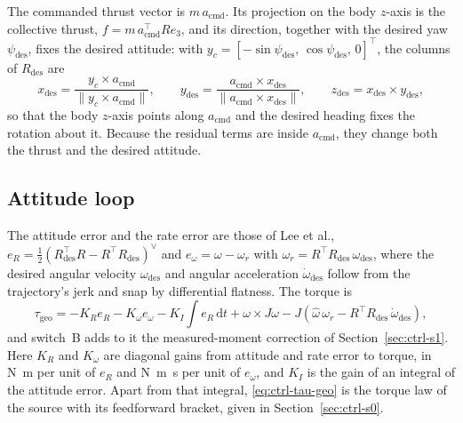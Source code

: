 The commanded thrust vector is $m\,a_{\mathrm{cmd}}$. Its projection on the body $z$-axis is the
collective thrust, $f = m\,a_{\mathrm{cmd}}^\top R e_3$, and its direction, together with the desired
yaw $\psi_{\mathrm{des}}$, fixes the desired attitude: with
$y_c = [-\sin\psi_{\mathrm{des}},\, \cos\psi_{\mathrm{des}},\, 0]^\top$, the columns of
$R_{\mathrm{des}}$ are
\begin{equation*}
  x_{\mathrm{des}} = \frac{y_c \times a_{\mathrm{cmd}}}{\lVert y_c \times a_{\mathrm{cmd}} \rVert}, \qquad
  y_{\mathrm{des}} = \frac{a_{\mathrm{cmd}} \times x_{\mathrm{des}}}{\lVert a_{\mathrm{cmd}} \times x_{\mathrm{des}} \rVert}, \qquad
  z_{\mathrm{des}} = x_{\mathrm{des}} \times y_{\mathrm{des}},
\end{equation*}
so that the body $z$-axis points along $a_{\mathrm{cmd}}$ and the desired heading fixes the rotation
about it. Because the residual terms are inside $a_{\mathrm{cmd}}$, they change both the thrust and
the desired attitude.

\subsection{Attitude loop}

The attitude error and the rate error are those of Lee et al.,
$e_R = \tfrac{1}{2}\left(R_{\mathrm{des}}^\top R - R^\top R_{\mathrm{des}}\right)^\vee$ and
$e_\omega = \omega - \omega_r$ with $\omega_r = R^\top R_{\mathrm{des}}\,\omega_{\mathrm{des}}$, where
the desired angular velocity $\omega_{\mathrm{des}}$ and angular acceleration
$\dot\omega_{\mathrm{des}}$ follow from the trajectory's jerk and snap by differential flatness. The
torque is
%
\begin{equation}
  \tau_{\mathrm{geo}} = -K_R e_R - K_\omega e_\omega - K_I \!\int\! e_R \,\mathrm{d}t + \omega \times J\omega
         - J\!\left( \hat{\omega}\, \omega_r - R^\top R_{\mathrm{des}}\, \dot\omega_{\mathrm{des}} \right),
  \label{eq:ctrl-tau-geo}
\end{equation}
%
and switch~B adds to it the measured-moment correction of Section~\ref{sec:ctrl-s1}. Here $K_R$ and
$K_\omega$ are diagonal gains from attitude and rate error to torque, in \si{\newton\metre} per unit
of $e_R$ and \si{\newton\metre\second} per unit of $e_\omega$, and $K_I$ is the gain of an integral
of the attitude error. Apart from that integral, \eqref{eq:ctrl-tau-geo} is the torque law of the
source with its feedforward bracket, given in Section~\ref{sec:ctrl-s0}.

